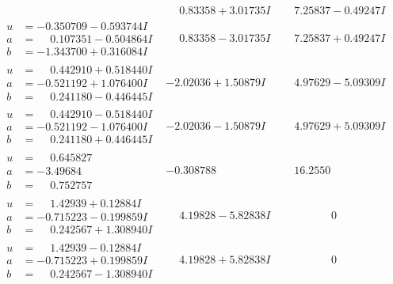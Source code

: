 \documentclass[1p]{elsarticle_modified}
\theoremstyle{definition}
\begin{document}
$$\begin{array}{c|c|c}
 & \phantom{-}0.83358 + 3.01735 I & \phantom{-}7.25837 - 0.49247 I \\ \hline\begin{aligned}
u &= -0.350709 - 0.593744 I \\
a &= \phantom{-}0.107351 - 0.504864 I \\
b &= -1.343700 + 0.316084 I\end{aligned}
 & \phantom{-}0.83358 - 3.01735 I & \phantom{-}7.25837 + 0.49247 I \\ \hline\begin{aligned}
u &= \phantom{-}0.442910 + 0.518440 I \\
a &= -0.521192 + 1.076400 I \\
b &= \phantom{-}0.241180 - 0.446445 I\end{aligned}
 & -2.02036 + 1.50879 I & \phantom{-}4.97629 - 5.09309 I \\ \hline\begin{aligned}
u &= \phantom{-}0.442910 - 0.518440 I \\
a &= -0.521192 - 1.076400 I \\
b &= \phantom{-}0.241180 + 0.446445 I\end{aligned}
 & -2.02036 - 1.50879 I & \phantom{-}4.97629 + 5.09309 I \\ \hline\begin{aligned}
u &= \phantom{-}0.645827\phantom{ +0.000000I} \\
a &= -3.49684\phantom{ +0.000000I} \\
b &= \phantom{-}0.752757\phantom{ +0.000000I}\end{aligned}
 & -0.308788\phantom{ +0.000000I} & \phantom{-}16.2550\phantom{ +0.000000I} \\ \hline\begin{aligned}
u &= \phantom{-}1.42939 + 0.12884 I \\
a &= -0.715223 - 0.199859 I \\
b &= \phantom{-}0.242567 + 1.308940 I\end{aligned}
 & \phantom{-}4.19828 - 5.82838 I & \phantom{-0.000000 } 0 \\ \hline\begin{aligned}
u &= \phantom{-}1.42939 - 0.12884 I \\
a &= -0.715223 + 0.199859 I \\
b &= \phantom{-}0.242567 - 1.308940 I\end{aligned}
 & \phantom{-}4.19828 + 5.82838 I & \phantom{-0.000000 } 0 \\ \hline\begin{aligned}

\end{aligned}
\end{array}$$
\end{document}
